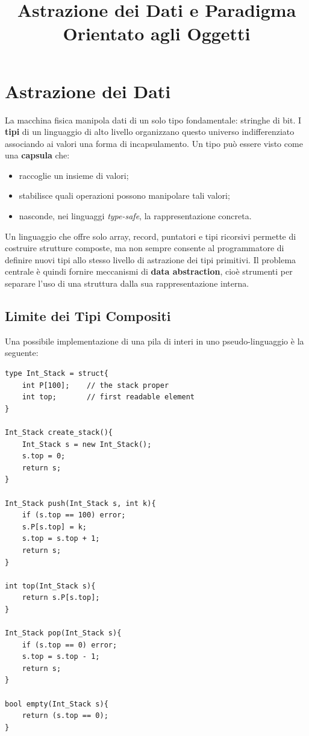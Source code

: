 \documentclass{article}
\title{Astrazione dei Dati e Paradigma Orientato agli Oggetti}
\author{}
\date{}
\begin{document}
\maketitle

\section{Astrazione dei Dati}

La macchina fisica manipola dati di un solo tipo fondamentale: stringhe di bit. I \textbf{tipi} di un linguaggio di alto livello organizzano questo universo indifferenziato associando ai valori una forma di incapsulamento. Un tipo può essere visto come una \textbf{capsula} che:
\begin{itemize}
  \item raccoglie un insieme di valori;
  \item stabilisce quali operazioni possono manipolare tali valori;
  \item nasconde, nei linguaggi \textit{type-safe}, la rappresentazione concreta.
\end{itemize}

Un linguaggio che offre solo array, record, puntatori e tipi ricorsivi permette di costruire strutture composte, ma non sempre consente al programmatore di definire nuovi tipi allo stesso livello di astrazione dei tipi primitivi. Il problema centrale è quindi fornire meccanismi di \textbf{data abstraction}, cioè strumenti per separare l'uso di una struttura dalla sua rappresentazione interna.

\subsection{Limite dei Tipi Compositi}

Una possibile implementazione di una pila di interi in uno pseudo-linguaggio è la seguente:

\begin{lstlisting}
type Int_Stack = struct{
    int P[100];    // the stack proper
    int top;       // first readable element
}

Int_Stack create_stack(){
    Int_Stack s = new Int_Stack();
    s.top = 0;
    return s;
}

Int_Stack push(Int_Stack s, int k){
    if (s.top == 100) error;
    s.P[s.top] = k;
    s.top = s.top + 1;
    return s;
}

int top(Int_Stack s){
    return s.P[s.top];
}

Int_Stack pop(Int_Stack s){
    if (s.top == 0) error;
    s.top = s.top - 1;
    return s;
}

bool empty(Int_Stack s){
    return (s.top == 0);
}
\end{lstlisting}
\end{document}

